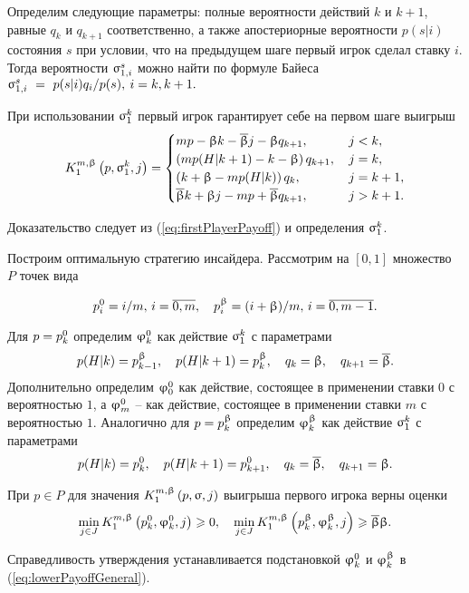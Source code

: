 Определим следующие параметры: полные вероятности действий $k$ и $k+1$, равные
$q_k$ и $q_{k+1}$ соответственно, а также апостериорные вероятности $p(s|i)$
состояния $s$ при условии, что на предыдущем шаге первый игрок сделал ставку
$i$. Тогда вероятности $\fGeneral[1,i]{s}$ можно найти по формуле Байеса $
\fGeneral[1,i]{s}~=~p(s|i)q_i/p(s), \: i = k, k + 1. $

\begin{proposition}
  При использовании $\fGeneral{k}$ первый игрок гарантирует себе на первом шаге
  выигрыш
  \begin{equation}
    \label{eq:lowerPayoffGeneral}
    \firstPlayerPayoff{1}{p}{\fGeneral{k}}{j} =
    \begin{cases}
      mp - \Co k - \DCo j - \Co q_{k+1},      & \, j < k,     \\
      \left(m p(H|k+1) - k - \Co \right) q_{k+1}, & \, j = k,     \\
      \left(k + \Co - m p(H|k) \right) q_k,       & \, j = k + 1, \\
      \DCo k + \Co j - mp + \DCo q_{k+1}, & \, j > k + 1.
    \end{cases}
  \end{equation}
\end{proposition}

Доказательство следует из (\ref{eq:firstPlayerPayoff}) и определения
$\fGeneral{k}$.

Построим оптимальную стратегию инсайдера. Рассмотрим на $[0,1]$ множество $P$
точек вида

\[
\pEven[i] = i/m, \, i = \overline{0, m}, \quad \pOdd[i] = (i + \Co)/m, \, i =
\overline{0, m - 1}.
\]

Для $p = \pEven$ определим $\fEven$ как действие $\fGeneral{k}$ с параметрами
\begin{equation*}
  p(H|k) = \pOdd[k-1], \quad p(H|k + 1) = \pOdd[k], \quad q_k = \Co, \quad q_{k+1} = \DCo.
\end{equation*}
Дополнительно определим $\fEven[0]$ как действие, состоящее в применении ставки
$0$ с вероятностью $1$, а $\fEven[m]$ -- как действие, состоящее в применении
ставки $m$ с вероятностью $1$. Аналогично для $p = \pOdd$ определим $\fOdd$ как
действие $\fGeneral{k}$ с параметрами
\begin{equation*}
  p(H|k) = \pEven[k], \quad p(H|k + 1) = \pEven[k+1], \quad q_k = \DCo, \quad q_{k+1} = \Co.
\end{equation*}

\begin{proposition}
  При $p \in P$ для значения $\firstPlayerPayoff{1}{p}{\sigma}{j}$ выигрыша
  первого игрока верны оценки
  \begin{equation}
    \label{eq:lowerBound:inequalities}
    \min_{j \in J}
    \firstPlayerPayoff{1}{\pEven}{\fEven}{j} \geq 0,
    \quad
    \min_{j \in J}
    \firstPlayerPayoff{1}{\pOdd}{\fOdd}{j} \geq \DCo\Co.
  \end{equation}
\end{proposition}
Справедливость утверждения устанавливается подстановкой $\fEven$ и $\fOdd$ в
(\ref{eq:lowerPayoffGeneral}).

